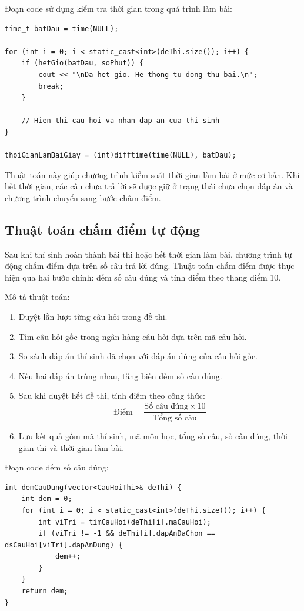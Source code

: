 \documentclass[12pt,a4paper]{report}
\begin{document}
Đoạn code sử dụng kiểm tra thời gian trong quá trình làm bài:

\begin{lstlisting}[style=cppstyle, caption={Kiểm tra thời gian khi làm bài}]
time_t batDau = time(NULL);

for (int i = 0; i < static_cast<int>(deThi.size()); i++) {
    if (hetGio(batDau, soPhut)) {
        cout << "\nDa het gio. He thong tu dong thu bai.\n";
        break;
    }

    // Hien thi cau hoi va nhan dap an cua thi sinh
}

thoiGianLamBaiGiay = (int)difftime(time(NULL), batDau);
\end{lstlisting}

Thuật toán này giúp chương trình kiểm soát thời gian làm bài ở mức cơ bản. Khi hết thời gian, các câu chưa trả lời sẽ được giữ ở trạng thái chưa chọn đáp án và chương trình chuyển sang bước chấm điểm.


\subsection{Thuật toán chấm điểm tự động}

Sau khi thí sinh hoàn thành bài thi hoặc hết thời gian làm bài, chương trình tự động chấm điểm dựa trên số câu trả lời đúng. Thuật toán chấm điểm được thực hiện qua hai bước chính: đếm số câu đúng và tính điểm theo thang điểm 10.

Mô tả thuật toán:

\begin{enumerate}
    \item Duyệt lần lượt từng câu hỏi trong đề thi.
    \item Tìm câu hỏi gốc trong ngân hàng câu hỏi dựa trên mã câu hỏi.
    \item So sánh đáp án thí sinh đã chọn với đáp án đúng của câu hỏi gốc.
    \item Nếu hai đáp án trùng nhau, tăng biến đếm số câu đúng.
    \item Sau khi duyệt hết đề thi, tính điểm theo công thức:
    \[
        \text{Điểm} = \frac{\text{Số câu đúng} \times 10}{\text{Tổng số câu}}
    \]
    \item Lưu kết quả gồm mã thí sinh, mã môn học, tổng số câu, số câu đúng, thời gian thi và thời gian làm bài.
\end{enumerate}

Đoạn code đếm số câu đúng:

\begin{lstlisting}[style=cppstyle, caption={Hàm đếm số câu trả lời đúng}]
int demCauDung(vector<CauHoiThi>& deThi) {
    int dem = 0;
    for (int i = 0; i < static_cast<int>(deThi.size()); i++) {
        int viTri = timCauHoi(deThi[i].maCauHoi);
        if (viTri != -1 && deThi[i].dapAnDaChon == dsCauHoi[viTri].dapAnDung) {
            dem++;
        }
    }
    return dem;
}
\end{lstlisting}
\end{document}
